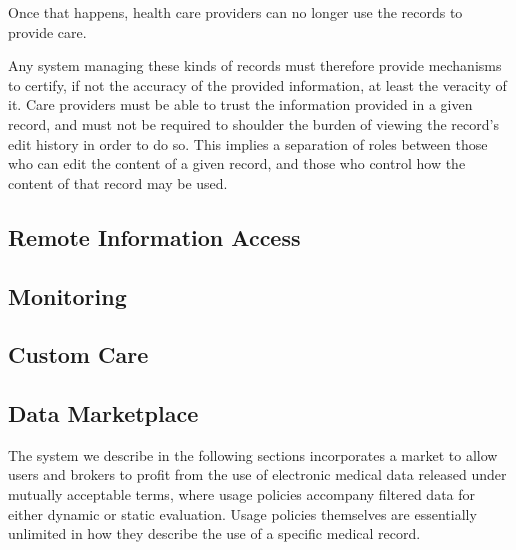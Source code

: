 \documentclass[10pt, conference, compsocconf]{IEEEtran}
\begin{document}
Once that happens, health care providers can no longer use the records to provide care.

Any system managing these kinds of records must therefore provide mechanisms to certify, if not the accuracy of the provided information, at least the veracity of it.  Care providers must be able to trust the information provided in a given record, and must not be required to shoulder the burden of viewing the record's edit history in order to do so.  This implies a separation of roles between those who can edit the content of a given record, and those who control how the content of that record may be used.

\subsection*{Remote Information Access}


\subsection*{Monitoring}

\subsection*{Custom Care}

\subsection*{Data Marketplace}
The system we describe in the following sections incorporates a market to allow users and brokers to profit from the use of electronic medical data released under mutually acceptable terms, where usage policies accompany filtered data for either dynamic or static evaluation.  Usage policies themselves are essentially unlimited in how they describe the use of a specific medical record.
\end{document}
